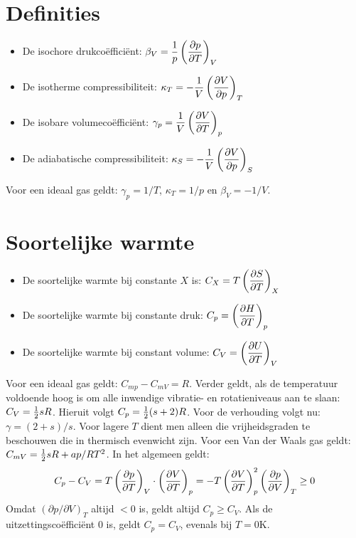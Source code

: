 \documentclass[twoside]{report}
\begin{document}
\section{Definities}
\begin{itemize}
\item De isochore drukco\"effici\"ent: $\displaystyle \beta_V=\frac{1}{p}\left(\frac{\partial p}{\partial T}\right)_{V}$
\item De isotherme compressibiliteit: $\displaystyle \kappa_T=-\frac{1}{V}\left(\frac{\partial V}{\partial p}\right)_{T}$
\item De isobare volumeco\"effici\"ent: $\displaystyle \gamma_p=\frac{1}{V}\left(\frac{\partial V}{\partial T}\right)_{p}$
\item De adiabatische compressibiliteit: $\displaystyle \kappa_S=-\frac{1}{V}\left(\frac{\partial V}{\partial p}\right)_{S}$
\end{itemize}
Voor een ideaal gas geldt: $\gamma_p=1/T$, $\kappa_T=1/p$ en $\beta_V=-1/V$.

\section{Soortelijke warmte}
\begin{itemize}
\item De soortelijke warmte bij constante $X$ is: $\displaystyle C_X=T\left(\frac{\partial S}{\partial T}\right)_{X}$
\item De soortelijke warmte bij constante druk: $\displaystyle C_p=\left(\frac{\partial H}{\partial T}\right)_{p}$
\item De soortelijke warmte bij constant volume: $\displaystyle C_V=\left(\frac{\partial U}{\partial T}\right)_{V}$
\end{itemize}
Voor een ideaal gas geldt: $C_{mp}-C_{mV}=R$. Verder geldt, als de
temperatuur voldoende hoog is om alle inwendige vibratie- en rotatieniveaus
aan te slaan: $C_V=\mbox{$\frac{1}{2}$} sR$. Hieruit volgt $C_p=\mbox{$\frac{1}{2}$}(s+2)R$. Voor de
verhouding volgt nu: $\gamma=(2+s)/s$. Voor lagere $T$ dient men alleen die
vrijheidsgraden te beschouwen die in thermisch evenwicht zijn. Voor een Van
der Waals gas geldt: $C_{mV}=\mbox{$\frac{1}{2}$} sR+ap/RT^2$.
\npar
In het algemeen geldt:
\[
C_p-C_V=T\left(\frac{\partial p}{\partial T}\right)_{V}\cdot\left(\frac{\partial V}{\partial T}\right)_{p}=-T\left(\frac{\partial V}{\partial T}\right)_{p}^2\left(\frac{\partial p}{\partial V}\right)_{T}\geq0
\]
Omdat $(\partial p/\partial V)_T$ altijd $<0$ is, geldt altijd $C_p\geq C_V$.
Als de uitzettingsco\"effici\"ent 0 is, geldt $C_p=C_V$, evenals bij $T=0$K.
\end{document}
